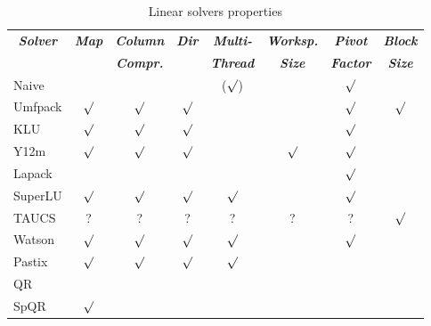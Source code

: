 \begin{table}
\centering
\caption{Linear solvers properties}\label{tab:linear-solvers-props}
\begin{tabular}{lccccccc}
\hline
	\multicolumn{1}{c}{\textbf{\emph{Solver}}} &
	\multicolumn{1}{c}{\textbf{\emph{Map}}} &
	\multicolumn{1}{c}{\textbf{\emph{Column}}} &
	\multicolumn{1}{c}{\textbf{\emph{Dir}}} &
	\multicolumn{1}{c}{\textbf{\emph{Multi-}}} &
	\multicolumn{1}{c}{\textbf{\emph{Worksp.}}} &
	\multicolumn{1}{c}{\textbf{\emph{Pivot}}} &
	\multicolumn{1}{c}{\textbf{\emph{Block}}} \\
	& & \multicolumn{1}{c}{\textbf{\emph{Compr.}}} &
	& \multicolumn{1}{c}{\textbf{\emph{Thread}}}
	& \multicolumn{1}{c}{\textbf{\emph{Size}}}
	& \multicolumn{1}{c}{\textbf{\emph{Factor}}}
	& \multicolumn{1}{c}{\textbf{\emph{Size}}} \\
\hline\hline
	Naive		&         &         &         & ($\surd$) &         & $\surd$ &	        \\
	Umfpack		& $\surd$ & $\surd$ & $\surd$ &           &         & $\surd$ & $\surd$ \\
	KLU		& $\surd$ & $\surd$ & $\surd$ &           &         & $\surd$ &	        \\
	Y12m		& $\surd$ & $\surd$ & $\surd$ &	          & $\surd$ & $\surd$ &	        \\
	Lapack		&         &         &         &           &         & $\surd$ &         \\
	SuperLU		& $\surd$ & $\surd$ & $\surd$ & $\surd$   &         & $\surd$ &	        \\
	TAUCS		& ?       & ?       & ?       & ?         & ?       & ?       & $\surd$ \\
	Watson		& $\surd$ & $\surd$ & $\surd$ & $\surd$   &         & $\surd$ &	        \\
	Pastix		& $\surd$ & $\surd$ & $\surd$ & $\surd$   &         &         &	        \\
	QR		&         &         &         &           &         &         &	        \\
	SpQR		& $\surd$ &         &         &           &         &         &	        \\
\hline
\end{tabular}
\end{table}

